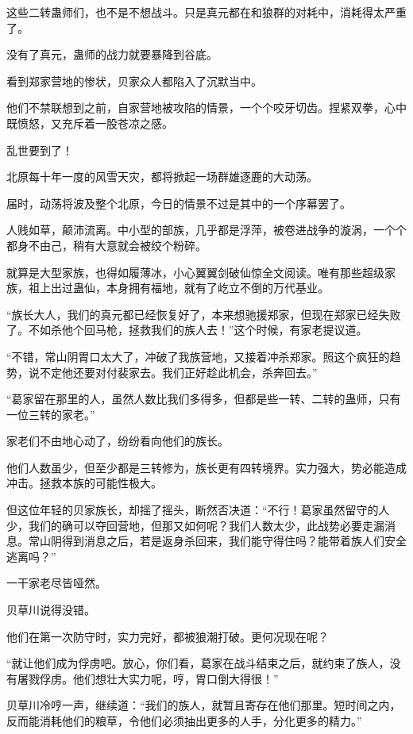 \begin{this_body}
这些二转蛊师们，也不是不想战斗。只是真元都在和狼群的对耗中，消耗得太严重了。

没有了真元，蛊师的战力就要暴降到谷底。

看到郑家营地的惨状，贝家众人都陷入了沉默当中。

他们不禁联想到之前，自家营地被攻陷的情景，一个个咬牙切齿。捏紧双拳，心中既愤怒，又充斥着一股苍凉之感。

乱世要到了！

北原每十年一度的风雪天灾，都将掀起一场群雄逐鹿的大动荡。

届时，动荡将波及整个北原，今日的情景不过是其中的一个序幕罢了。

人贱如草，颠沛流离。中小型的部族，几乎都是浮萍，被卷进战争的漩涡，一个个都身不由己，稍有大意就会被绞个粉碎。

就算是大型家族，也得如履薄冰，小心翼翼剑破仙惊全文阅读。唯有那些超级家族，祖上出过蛊仙，本身拥有福地，就有了屹立不倒的万代基业。

“族长大人，我们的真元都已经恢复好了，本来想驰援郑家，但现在郑家已经失败了。不如杀他个回马枪，拯救我们的族人去！”这个时候，有家老提议道。

“不错，常山阴胃口太大了，冲破了我族营地，又接着冲杀郑家。照这个疯狂的趋势，说不定他还要对付裴家去。我们正好趁此机会，杀奔回去。”

“葛家留在那里的人，虽然人数比我们多得多，但都是些一转、二转的蛊师，只有一位三转的家老。”

家老们不由地心动了，纷纷看向他们的族长。

他们人数虽少，但至少都是三转修为，族长更有四转境界。实力强大，势必能造成冲击。拯救本族的可能性极大。

但这位年轻的贝家族长，却摇了摇头，断然否决道：“不行！葛家虽然留守的人少，我们的确可以夺回营地，但那又如何呢？我们人数太少，此战势必要走漏消息。常山阴得到消息之后，若是返身杀回来，我们能守得住吗？能带着族人们安全逃离吗？”

一干家老尽皆哑然。

贝草川说得没错。

他们在第一次防守时，实力完好，都被狼潮打破。更何况现在呢？

“就让他们成为俘虏吧。放心，你们看，葛家在战斗结束之后，就约束了族人，没有屠戮俘虏。他们想壮大实力呢，哼，胃口倒大得很！”

贝草川冷哼一声，继续道：“我们的族人，就暂且寄存在他们那里。短时间之内，反而能消耗他们的粮草，令他们必须抽出更多的人手，分化更多的精力。”


\end{this_body}
